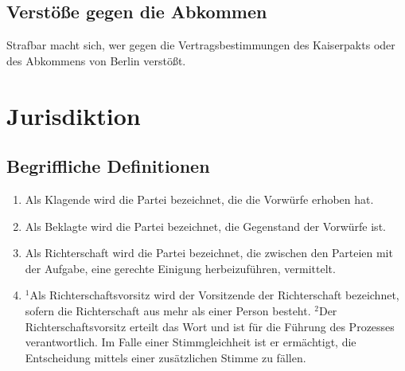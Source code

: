 \documentclass{article}
\begin{document}
\subsection{Verstöße gegen die Abkommen}
Strafbar macht sich, wer gegen die Vertragsbestimmungen des Kaiserpakts oder des Abkommens von Berlin verstößt.

\section{Jurisdiktion}
\subsection{Begriffliche Definitionen}
\begin{enumerate}[(1)]
    \item Als Klagende wird die Partei bezeichnet, die die Vorwürfe erhoben hat.
    \item Als Beklagte wird die Partei bezeichnet, die Gegenstand der Vorwürfe ist.
    \item Als Richterschaft wird die Partei bezeichnet, die zwischen den Parteien mit der Aufgabe, eine gerechte Einigung herbeizuführen, vermittelt.
    \item ${^1}$Als Richterschaftsvorsitz wird der Vorsitzende der Richterschaft bezeichnet, sofern die Richterschaft aus mehr als einer Person besteht. ${^2}$Der Richterschaftsvorsitz erteilt das Wort und ist für die Führung des Prozesses verantwortlich. Im Falle einer Stimmgleichheit ist er ermächtigt, die Entscheidung mittels einer zusätzlichen Stimme zu fällen.
\end{enumerate}
\end{document}
